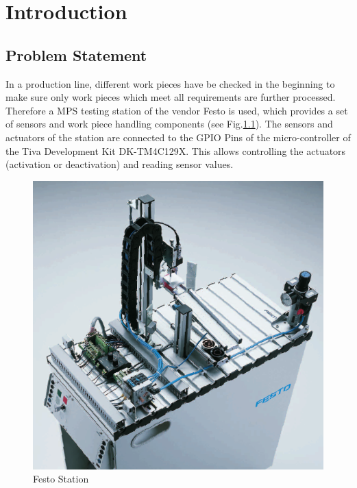 \chapter{Introduction} \label{ch:Introduction} %

\section{Problem Statement} \label{sec:ProblemStatement}
In a production line, different work pieces have be checked in the beginning to make sure only work pieces which meet all requirements are further processed. Therefore a MPS testing station of the vendor Festo is used, which provides a set of sensors and work piece handling components (see Fig.\ref{fig:festostation}). The sensors and actuators of the station are connected to the GPIO Pins of the micro-controller of the Tiva Development Kit DK-TM4C129X. This allows controlling the actuators (activation or deactivation) and reading sensor values.

\begin{figure}[H]
	\begin{center}
		\includegraphics[scale=.50]{media/FestoStation.png} 	
		\caption{Festo Station}
		\label{fig:festostation}
	\end{center}
\end{figure}

